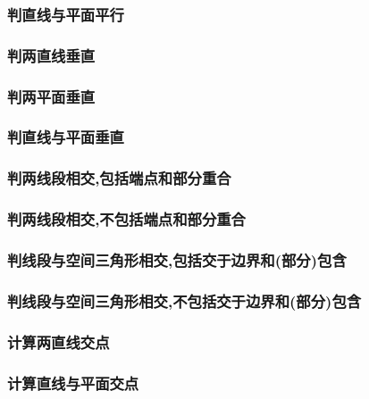 \subsubsection{判直线与平面平行}

\subsubsection{判两直线垂直}

\subsubsection{判两平面垂直}

\subsubsection{判直线与平面垂直}

\subsubsection{判两线段相交,包括端点和部分重合}

\subsubsection{判两线段相交,不包括端点和部分重合}

\subsubsection{判线段与空间三角形相交,包括交于边界和(部分)包含}

\subsubsection{判线段与空间三角形相交,不包括交于边界和(部分)包含}

\subsubsection{计算两直线交点}

\subsubsection{计算直线与平面交点}

